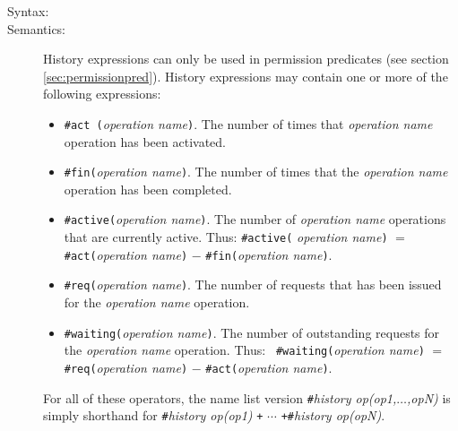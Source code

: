 \documentclass[\pformat,12pt]{article}
\begin{document}
\begin{description}
\item[Syntax:] 

\item[Semantics:] History expressions can only be used in
permission predicates (see section \ref{sec:permissionpred}). History
expressions may contain one or more of the following expressions:
  
\begin{itemize}
\item {\tt \#act (}{\em operation name}{\tt )}. The number of times
  that {\em operation name} operation has been activated.
\item {\tt \#fin(}{\em operation name}{\tt )}. The number of times that
  the {\em operation name} operation has been completed.
\item {\tt \#active(}{\em operation name}{\tt )}. The number of {\em operation
  name} operations that are currently active.  Thus: {\tt \#active(}{\em
    operation name}{\tt )} $=$ {\tt \#act(}{\em operation name}{\tt )}
  $-$ {\tt \#fin(}{\em operation name}{\tt )}.
\item {\tt \#req(}{\em operation name}{\tt )}. The number of requests
  that has been issued for the {\em operation name} operation.
\item {\tt \#waiting(}{\em operation name}{\tt )}. The number of
  outstanding requests for the {\em operation name} operation. Thus: {\tt
    \#waiting(}{\em operation name}{\tt )} $=$ {\tt \#req(}{\em operation
    name}{\tt )} $-$ {\tt \#act(}{\em operation name}{\tt )}.
\end{itemize}
For all of these operators, the name list version
\texttt{\#}\textit{history op(op1,$\ldots$,opN)} is simply shorthand
for \texttt{\#}\textit{history op(op1)} \texttt{+} $\mathtt{\cdots}$
\texttt{+\#}\textit{history op(opN)}.


\end{description}
\end{document}
